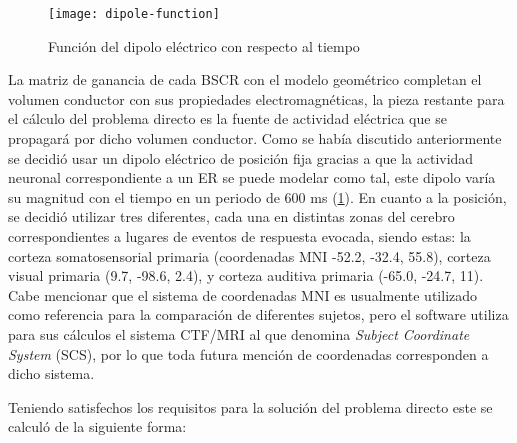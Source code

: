 \begin{figure}[tb]
	\centering
	\texttt{[image: dipole-function]}
	\caption{Función del dipolo eléctrico con respecto al tiempo }
	\label{fig:methodology:dipole}
\end{figure}

La matriz de ganancia de cada BSCR con el modelo geométrico completan el volumen conductor con sus propiedades electromagnéticas, la pieza restante para el cálculo del problema directo es la fuente de actividad eléctrica que se propagará por dicho volumen conductor. Como se había discutido anteriormente se decidió usar un dipolo eléctrico de posición fija gracias a que la actividad neuronal correspondiente a un ER se puede modelar como tal, este dipolo varía su magnitud con el tiempo en un periodo de 600 ms (\cref{fig:methodology:dipole}). En cuanto a la posición, se decidió utilizar tres diferentes, cada una en distintas zonas del cerebro correspondientes a lugares de eventos de respuesta evocada, siendo estas: la corteza somatosensorial primaria (coordenadas MNI -52.2, -32.4, 55.8), corteza visual primaria (9.7, -98.6, 2.4), y corteza auditiva primaria (-65.0, -24.7, 11). Cabe mencionar que el sistema de coordenadas MNI  es usualmente utilizado como referencia para la comparación de diferentes sujetos, pero el software utiliza para sus cálculos el sistema CTF/MRI al que denomina \emph{Subject Coordinate System} (SCS), por lo que toda futura mención de coordenadas corresponden a dicho sistema.

Teniendo satisfechos los requisitos para la solución del problema directo este se calculó de la siguiente forma:

